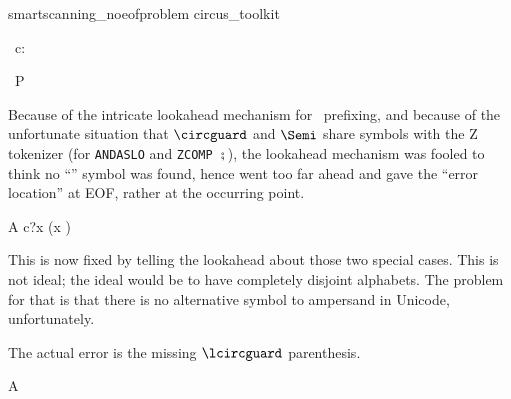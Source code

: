 \begin{zsection}
    \SECTION smartscanning\_noeofproblem \parents circus\_toolkit
\end{zsection}

\begin{circus}
   \circchannel\ c: \nat
\end{circus}

\begin{circus}
  \circprocess\ P \circdef \circbegin
\end{circus}

Because of the intricate lookahead mechanism for \Circus\ prefixing,
and because of the unfortunate situation that $\circguard$ and $\Semi$
share symbols with the Z tokenizer (for \texttt{ANDASLO} and 
\texttt{ZCOMP} $\semi$), the lookahead mechanism was fooled to think
no ``\Circus'' symbol was found, hence went too far ahead and gave
the ``error location'' at EOF, rather at the occurring point.
\begin{circusaction}
   A \circdef c?x \then (x  \circguard \Skip)
\end{circusaction}
This is now fixed by telling the lookahead about those two special cases.
This is not ideal; the ideal would be to have completely disjoint alphabets.
The problem for that is that there is no alternative symbol to ampersand in
Unicode, unfortunately. 

The actual error is the missing $\lcircguard$ parenthesis.


\begin{circusaction}
   \circspot A
\end{circusaction}

\begin{circus}
   \circend
\end{circus}